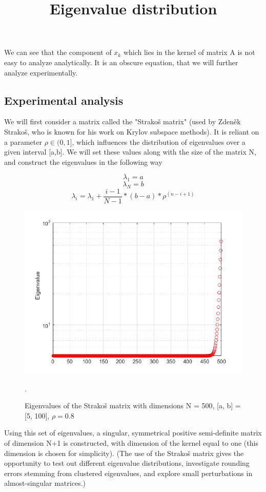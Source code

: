 We can see that the component of \(x_k\) which lies in the kernel of matrix A is not easy to analyze analytically. It is an obscure equation, that we will further analyze experimentally.

\subsection{Experimental analysis}

We will first consider a matrix called the "Strakoš matrix" (used by Zdeněk Strakoš, who is known for his work on Krylov subspace methods). It is reliant on a parameter \(\rho \in {(0,1]}\), which influences the distribution of eigenvalues over a given interval [a,b]. We will set these values along with the size of the matrix N, and construct the eigenvalues in the following way

\[\lambda_1 = a \]
\[\lambda_N = b \]
\begin{equation}
    \lambda_i = \lambda_1 + \frac{i-1}{N-1}*(b-a)*\rho^{(n-i+1)}
\end{equation}

\begin{figure}[htp]
\centering
\title{Eigenvalue distribution}
\includegraphics[width=0.7\linewidth]{img/diagonal_val.png}
\caption{Eigenvalues of the Strakoš matrix with dimensions N = 500, [a, b] = [5, 100], \(\rho = 0.8\)}. 
\label{fig:eig distribution}
\end{figure}
 
Using this set of eigenvalues, a singular, symmetrical positive semi-definite matrix of dimension N+1 is constructed, with dimension of the kernel equal to one (this dimension is chosen for simplicity). 
(The use of the Strakoš matrix gives the opportunity to test out different eigenvalue distributions, investigate rounding errors stemming from clustered eigenvalues, and explore small perturbations in almost-singular matrices.)


